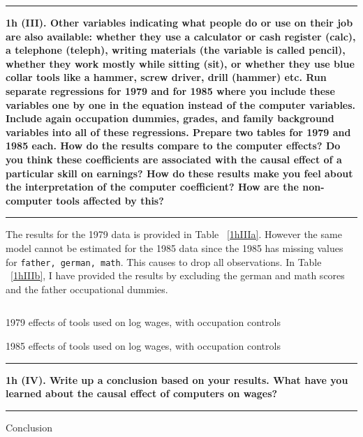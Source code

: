 \documentclass[12pt]{article}
\newcommand\question[1]{\vspace{1em}\hrule\vspace{1em}\textbf{#1}\vspace{1em}\hrule\vspace{1em}}
\begin{document}
\newpage
\question{1h (III). Other variables indicating what people do or use on their job are also available: whether they use a calculator or cash register (calc), a telephone (teleph), writing materials (the variable is called pencil), whether they work mostly while sitting (sit), or whether they use blue collar tools like a hammer, screw driver, drill (hammer) etc. Run separate regressions for 1979 and for 1985 where you include these variables one by one in the equation instead of the computer variables. Include again occupation dummies, grades, and family background variables into all of these regressions. Prepare two tables for 1979 and 1985 each. How do the results compare to the computer effects? Do you think these coefficients are associated with the causal effect of a particular skill on earnings? How do these results make you feel about the interpretation of the computer coefficient? How are the non-computer tools affected by this?}
The results for the 1979 data is provided in Table ~\ref{1hIIIa}. However the same model cannot be estimated for the 1985 data since the 1985 has missing values for \texttt{father, german, math}. This causes \stata to drop all observations. In Table ~\ref{1hIIIb}, I have provided the results by excluding the german and math scores and the father occupational dummies.

\begin{lstlisting}
\end{lstlisting}

\begin{center}
\begin{table}
\caption{1979 effects of tools used on log wages, with occupation controls}

\label{1hIIIa}
\end{table}
\newpage
\begin{table}
\caption{1985 effects of tools used on log wages, with occupation controls}

\label{1hIIIb}
\end{table}
\end{center}

\restoregeometry 
\newpage
\question{1h (IV). Write up a conclusion based on your results. What have you learned about the causal effect of computers on wages?}
Conclusion



\end{document}
